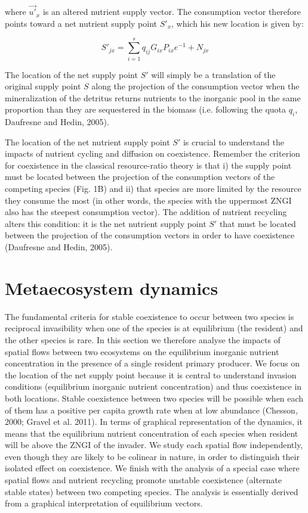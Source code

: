 \documentclass[12pt]{paper}
\begin{document}
where $\overrightarrow{u'}_{x}$ is an altered nutrient supply vector. The consumption vector therefore points toward a net nutrient supply point $S'_{x}$, which his new location is given by:

\begin{equation}
	\label{e:bnet}
	S'_{jx}=\sum_{i=1}^{s}q_{ij}G_{ix}P_{ix}e^{-1}+N_{jx}
\end{equation}

The location of the net supply point $S'$ will simply be a translation of the original supply point $S$ along the projection of the consumption vector when the mineralization of the detritus returns nutrients to the inorganic pool in the same proportion than they are sequestered in the biomass (i.e. following the quota $q_{i}$, Daufresne and Hedin, 2005). 

	The location of the net nutrient supply point $S'$ is crucial to understand the impacts of nutrient cycling and diffusion on coexistence. Remember the criterion for coexistence in the classical resource-ratio theory is that i) the supply point must be located between the projection of the consumption vectors of the competing species (Fig. 1B) and ii) that species are more limited by the resource they consume the most (in other words, the species with the uppermost ZNGI also has the steepest consumption vector). The addition of nutrient recycling alters this condition: it is the net nutrient supply point $S'$ that must be located between the projection of the consumption vectors in order to have coexistence (Daufresne and Hedin, 2005). 

\section{Metaecosystem dynamics}

The fundamental criteria for stable coexistence to occur between two species is reciprocal invasibility when one of the species is at equilibrium (the resident) and the other species is rare. In this section we therefore analyse the impacts of spatial flows between two ecosystems on the equilibrium inorganic nutrient concentration in the presence of a single resident primary producer. We focus on the location of the net supply point because it is central to understand invasion conditions (equilibrium inorganic nutrient concentration) and thus coexistence in both locations. Stable coexistence between two species will be possible when each of them has a positive per capita growth rate when at low abundance (Chesson, 2000; Gravel et al. 2011). In terms of graphical representation of the dynamics, it means that the equilibrium nutrient concentration of each species when resident will be above the ZNGI of the invader. We study each spatial flow independently, even though they are likely to be colinear in nature, in order to distinguish their isolated effect on coexistence. We finish with the analysis of a special case where spatial flows and nutrient recycling promote unstable coexistence (alternate stable states) between two competing species. The analysis is essentially derived from a graphical interpretation of equilibrium vectors.
\end{document}

